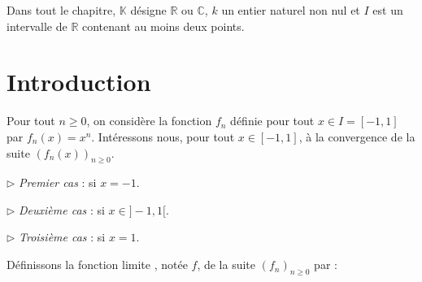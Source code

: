 \documentclass[a4paper,10pt]{report}
\begin{document}



\noindent Dans tout le chapitre, $\mathbb{K}$ désigne $\mathbb{R}$ ou $\mathbb{C}$, $k$ un entier naturel non nul et $I$ est un intervalle de $\mathbb{R}$ contenant au moins deux points.

\medskip

\section{Introduction} 

\noindent Pour tout $n \geq 0$, on considère la fonction $f_n$ définie pour tout $x \in I= [-1,1]$ par $f_n(x)=x^n$. Intéressons nous, pour tout $x \in [-1,1]$, à la convergence de la suite $(f_n(x))_{n \geq 0}$.

\medskip

\noindent $\rhd$ \textit{Premier cas} : si $x=-1$.

%

\vspace{2.5cm}
\noindent $\rhd$ \textit{Deuxième cas} : si $x \in ]-1,1[$.
%

\vspace{2.5cm}


\noindent $\rhd$ \textit{Troisième cas} : si $x=1$.
%
%
\vspace{2.5cm}

\noindent Définissons la fonction \og limite \fg, notée $f$, de la suite $(f_n)_{n \geq 0}$ par :

\vspace{2.5cm}
\end{document}
